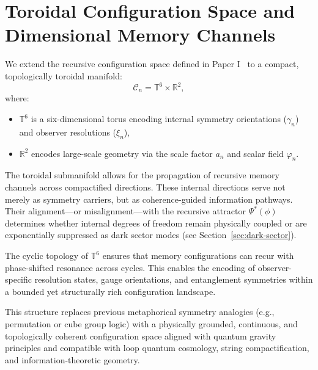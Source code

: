 \section{Toroidal Configuration Space and Dimensional Memory Channels}
\label{sec:torus-space}

We extend the recursive configuration space defined in Paper I~\cite{parian2025selfrememberingI} to a compact, topologically toroidal manifold:
\[
\mathcal{C}_n = \mathbb{T}^6 \times \mathbb{R}^2,
\]
where:
\begin{itemize}
    \item \( \mathbb{T}^6 \) is a six-dimensional torus encoding internal symmetry orientations (\( \gamma_n \)) and observer resolutions (\( \xi_n \)),
    \item \( \mathbb{R}^2 \) encodes large-scale geometry via the scale factor \( a_n \) and scalar field \( \varphi_n \).
\end{itemize}

The toroidal submanifold allows for the propagation of recursive memory channels across compactified directions. These internal directions serve not merely as symmetry carriers, but as coherence-guided information pathways. Their alignment—or misalignment—with the recursive attractor \( \Psi^*(\phi) \) determines whether internal degrees of freedom remain physically coupled or are exponentially suppressed as dark sector modes (see Section~\ref{sec:dark-sector}).

The cyclic topology of \( \mathbb{T}^6 \) ensures that memory configurations can recur with phase-shifted resonance across cycles. This enables the encoding of observer-specific resolution states, gauge orientations, and entanglement symmetries within a bounded yet structurally rich configuration landscape.

This structure replaces previous metaphorical symmetry analogies (e.g., permutation or cube group logic) with a physically grounded, continuous, and topologically coherent configuration space aligned with quantum gravity principles and compatible with loop quantum cosmology, string compactification, and information-theoretic geometry.

